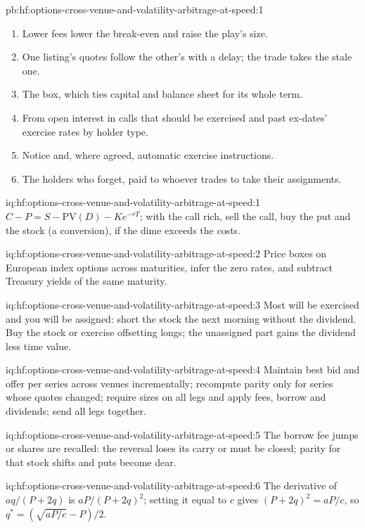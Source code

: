 \begin{solution}{pb:hf:options-cross-venue-and-volatility-arbitrage-at-speed:1}
\begin{enumerate}
\item Lower fees lower the break-even and raise the play's size.
\item One listing's quotes follow the other's with a delay; the trade takes the stale one.
\item The box, which ties capital and balance sheet for its whole term.
\item From open interest in calls that should be exercised and past ex-dates' exercise rates by holder type.
\item Notice and, where agreed, automatic exercise instructions.
\item The holders who forget, paid to whoever trades to take their assignments.
\end{enumerate}
\end{solution}

\begin{solution}{iq:hf:options-cross-venue-and-volatility-arbitrage-at-speed:1}
$C-P=S-\mathrm{PV}(D)-Ke^{-rT}$; with the call rich, sell the call, buy the put and the stock (a conversion), if the dime exceeds the costs.
\end{solution}

\begin{solution}{iq:hf:options-cross-venue-and-volatility-arbitrage-at-speed:2}
Price boxes on European index options across maturities, infer the zero rates, and subtract Treasury yields of the same maturity.
\end{solution}

\begin{solution}{iq:hf:options-cross-venue-and-volatility-arbitrage-at-speed:3}
Most will be exercised and you will be assigned: short the stock the next morning without the dividend. Buy the stock or exercise offsetting longs;
the unassigned part gains the dividend less time value.
\end{solution}

\begin{solution}{iq:hf:options-cross-venue-and-volatility-arbitrage-at-speed:4}
Maintain best bid and offer per series across venues incrementally; recompute parity only for series whose quotes changed; require sizes on all legs
and apply fees, borrow and dividends; send all legs together.
\end{solution}

\begin{solution}{iq:hf:options-cross-venue-and-volatility-arbitrage-at-speed:5}
The borrow fee jumps or shares are recalled: the reversal loses its carry or must be closed; parity for that stock shifts and puts become dear.
\end{solution}

\begin{solution}{iq:hf:options-cross-venue-and-volatility-arbitrage-at-speed:6}
The derivative of $aq/(P+2q)$ is $aP/(P+2q)^2$; setting it equal to $c$ gives $(P+2q)^2=aP/c$, so $q^\ast=(\sqrt{aP/c}-P)/2$.
\end{solution}
